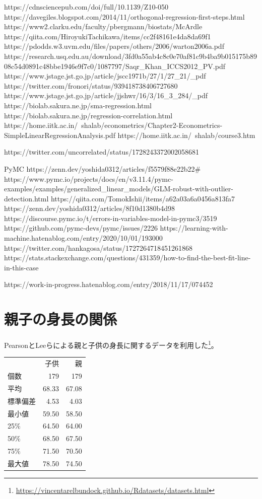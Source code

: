 https://cdnsciencepub.com/doi/full/10.1139/Z10-050
https://davegiles.blogspot.com/2014/11/orthogonal-regression-first-steps.html
https://www2.clarku.edu/faculty/pbergmann/biostats/McArdle%
https://qiita.com/HiroyukiTachikawa/items/cc2f48161e4da8da69f1
https://pdodds.w3.uvm.edu/files/papers/others/2006/warton2006a.pdf
https://research.usq.edu.au/download/3fd0a55ab4c8c0e70af81c9b4ba9b015175b8908c54d0891c48bbe1946e9f7c0/1087797/Saqr_Khan_ICCS2012_PV.pdf
https://www.jstage.jst.go.jp/article/jscc1971b/27/1/27_21/_pdf
https://twitter.com/fronori/status/939418738406727680
https://www.jstage.jst.go.jp/article/jjshwr/16/3/16_3_284/_pdf
https://biolab.sakura.ne.jp/sma-regression.html
https://biolab.sakura.ne.jp/regression-correlation.html
https://home.iitk.ac.in/~shalab/econometrics/Chapter2-Econometrics-SimpleLinearRegressionAnalysis.pdf
https://home.iitk.ac.in/~shalab/course3.htm



https://twitter.com/uncorrelated/status/1728243372002058681

PyMC
https://zenn.dev/yoshida0312/articles/f5579f88e22b22#%
https://www.pymc.io/projects/docs/en/v3.11.4/pymc-examples/examples/generalized_linear_models/GLM-robust-with-outlier-detection.html
https://qiita.com/TomokIshii/items/a62a03a6a0456a813fa7
https://zenn.dev/yoshida0312/articles/8f10d1380b4d98
https://discourse.pymc.io/t/errors-in-variables-model-in-pymc3/3519
https://github.com/pymc-devs/pymc/issues/2226
https://learning-with-machine.hatenablog.com/entry/2020/10/01/193000
https://twitter.com/hankagosa/status/1727264718451261868
https://stats.stackexchange.com/questions/431359/how-to-find-the-best-fit-line-in-this-case

https://work-in-progress.hatenablog.com/entry/2018/11/17/074452

\fi



\chapter{親子の身長の関係}


PearsonとLeeらによる親と子供の身長に関するデータを利用した\footnote{\url{https://vincentarelbundock.github.io/Rdatasets/datasets.html}}。
\begin{table}[http]
 \centering
 \begin{tabular}{lrr}
  {} &  子供 &  親 \\
  個数 & 179 &  179 \\
  平均  &  68.33 &   67.08 \\
  標準偏差   &   4.53 &    4.03 \\
  最小値   &  59.50 &   58.50 \\
  25\%   &  64.50 &   64.00 \\
  50\%   &  68.50 &   67.50 \\
  75\%   &  71.50 &   70.50 \\
  最大値   &  78.50 &   74.50 \\
 \end{tabular}
\end{table}


